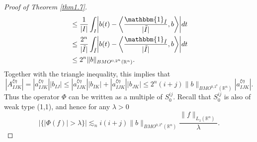 \documentclass[oneside,english,a4wide]{amsart}
\numberwithin{equation}{section}
\numberwithin{figure}{section}
\theoremstyle{plain}
\theoremstyle{plain}
\theoremstyle{definition}
\theoremstyle{plain}
\theoremstyle{remark}
\theoremstyle{definition}
\theoremstyle{remark}
\theoremstyle{definition}
\newcommand{\8}{\infty}
\begin{document}
\begin{proof}[Proof of Theorem \ref{thm1.7}]
\begin{equation*}
\begin{aligned}
		&\le \frac{1}{|I|}\int_I \biggl|b(t)-\biggl\langle\frac{\mathbbm{1}_{\tilde{I}}}{|\tilde{I}|},b\bigg\rangle\biggr|dt\\
		&\le\frac{2^n}{|\tilde{I}|}\int_{\tilde{I}} \biggl|b(t)-\biggl\langle\frac{\mathbbm{1}_{\tilde{I}}}{|\tilde{I}|},b\bigg\rangle\biggr|dt\\
		&\le 2^n\|b\|_{BMO^{0, 2^n}(\mathbb{R}^n)}.
	\end{aligned}
\end{equation*}
Together with the triangle inequality, this implies that 
\begin{equation*}
	|A_{IJK}^{\xi\eta}|=|a_{IJK}^{\xi\eta}||b_{IJ}|\le |a_{IJK}^{\xi\eta}||b_{IK}|+|a_{IJK}^{\xi\eta}||b_{JK}|\le 2^n(i+j)\|b\|_{BMO^{0, 2^n}(\mathbb{R}^n)}|a_{IJK}^{\xi\eta}|.
\end{equation*}
Thus the operator $\varPhi$ can be written as a multiple of $S_0^{ij}$. Recall that $S_0^{ij}$ is also of weak type (1,1), and hence for any $\lambda>0$
\begin{equation*}
	|\{|\varPhi(f)|>\lambda\}|\lesssim_n i(i+j) \|b\|_{BMO^{0, 2^n}(\mathbb{R}^n)}\frac{\|f\|_{L_1(\mathbb{R}^n)}}{\lambda}.
\end{equation*}


\end{proof}
\end{document}
